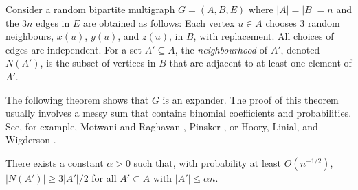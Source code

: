 \documentclass{patmorin}
\begin{document}
Consider a random bipartite multigraph $G=(A,B,E)$ where $|A|=|B|=n$
and the $3n$ edges in $E$ are obtained as follows:  Each vertex $u\in A$
chooses 3 random neighbours, $x(u)$, $y(u)$, and $z(u)$, in $B$, with
replacement.  All choices of edges are independent. For a set $A'\subseteq
A$, the \emph{neighbourhood} of $A'$, denoted $N(A')$, is the subset of
vertices in $B$ that are adjacent to at least one element of $A'$.

The following theorem shows that $G$ is an expander.  The proof of
this theorem usually involves a messy sum that contains binomial
coefficients and probabilities.  See, for example, Motwani and
Raghavan \cite[Theorem~5.3]{motwani.raghavan:randomized}, Pinsker
\cite[Lemma 1]{pinsker:on}, or Hoory, Linial, and Wigderson
\cite[Lemma~1.9]{hoory.linial.ea:expander}.

\begin{thm}
  There exists a constant $\alpha >0$ such that, with probability at
  least $O(n^{-1/2})$, $|N(A')| \ge 3|A'|/2$ for all $A'\subset A$
  with $|A'|\le \alpha n$.
\end{thm}
\end{document}
